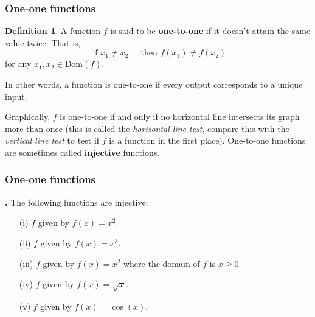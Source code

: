 \documentclass[t]{beamer}
\theoremstyle{plain}
\theoremstyle{definition}
\newtheorem{dfn}{Definition}
\newcounter{heading}
\newcommand{\newhead}[1]{\medskip\stepcounter{heading}\noindent\textbf{\hspace{0.2cm}{#1}.}}
\newcommand{\Dom}{\mathrm{Dom}}
\begin{document}
\begin{frame}
\frametitle{One-one functions}
\begin{dfn} A function $f$ is said to be \textbf{one-to-one} if it doesn't attain the same value twice.  That is, \[\text{ if } x_{1} \neq x_{2}, \textrm{ } \text{ then } f(x_{1}) \neq f(x_{2}) \]
for any $x_1,x_2\in\Dom(f)$.\end{dfn}\pause

\medskip

\noindent In other words, a function is one-to-one if every output corresponds to a unique input. \pause

\vspace*{.2cm}

\noindent Graphically, $f$ is one-to-one if and only if no horizontal line intersects its graph more than once (this is called the \emph{horizontal line test}, compare this with the \emph{vertical line test} to test if $f$ is a function in the first place).  One-to-one functions are sometimes called \textbf{injective} functions.  
\end{frame}

\begin{frame}
\frametitle{One-one functions}
\newhead{True or false?} The following functions are injective:
\begin{enumerate}[<+->]

\item[(i)] $f$ given by $f(x) = x^{2}$.
\vspace*{.5cm}

\item[(ii)] $f$ given by $f(x) = x^{3}$.
\vspace*{.5cm}

\item[(iii)] $f$ given by $f(x) = x^{2}$ where the domain of $f$ is $x \geq 0$.
\vspace*{.5cm}

\item[(iv)] $f$ given by $f(x) = \sqrt{x}$.
\vspace*{.5cm}

\item[(v)] $f$ given by $f(x) = \cos(x)$.
\vspace*{.5cm}

\end{enumerate}
\end{frame}
\end{document}
